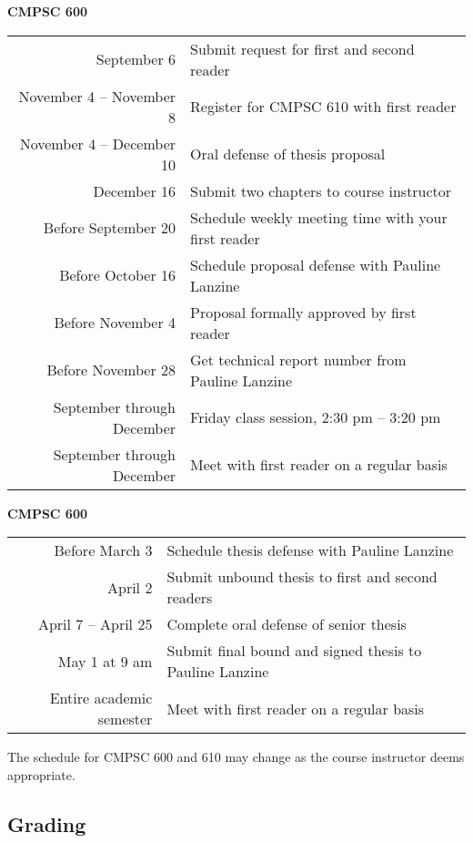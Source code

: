 {\bf CMPSC 600}
\begin{center}
\begin{tabular}{r|l}
\hline
September 6 & Submit request for first and second reader \\ 
November 4 -- November 8 & Register for CMPSC 610 with first reader \\
November 4 -- December 10 & Oral defense of thesis proposal \\
December 16 & Submit two chapters to course instructor \\
\hline
Before September 20 & Schedule weekly meeting time with your first reader \\
Before October 16 & Schedule proposal defense with Pauline Lanzine \\
Before November 4 & Proposal formally approved by first reader \\
Before November 28 & Get technical report number from Pauline Lanzine\\
\hline
September through December & Friday class session, 2:30 pm -- 3:20 pm \\
September through December & Meet with first reader on a regular basis \\
\hline
\end{tabular}
\end{center}


{\bf CMPSC 600}
\begin{center}
\begin{tabular}{r|l}
\hline
Before March 3 & Schedule thesis defense with Pauline Lanzine \\
April 2 & Submit unbound thesis to first and second readers \\
April 7 -- April 25 & Complete oral defense of senior thesis \\
May 1 at 9 am & Submit final bound and signed thesis to Pauline Lanzine \\
\hline
Entire academic semester & Meet with first reader on a regular basis \\ 
\hline
\end{tabular}
\end{center}

\noindent
The schedule for CMPSC 600 and 610 may change as the course instructor deems appropriate.

\vspace*{-.1in}
\subsection*{Grading}

